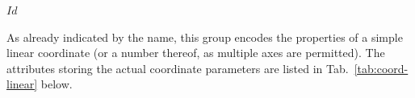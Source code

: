 \svnInfo $Id$


As already indicated by the name, this group encodes the properties of a simple
linear coordinate (or a number thereof, as multiple axes are
permitted). The attributes storing the actual coordinate parameters
are listed in Tab.~\ref{tab:coord-linear} below.


